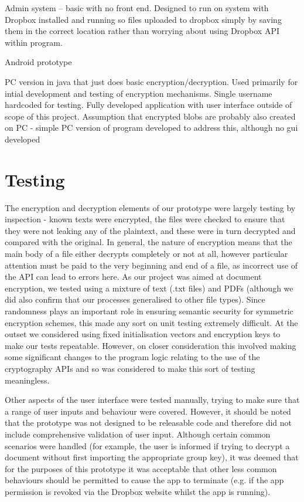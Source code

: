 Admin system – basic with no front end.  Designed to run on system with Dropbox installed and running so files uploaded to dropbox simply by saving them in the correct location rather than worrying about using Dropbox API within program.

Android prototype

PC version in java that just does basic encryption/decryption.  Used primarily for intial development and testing of encryption mechanisms. Single username hardcoded for testing. Fully developed application with user interface outside of scope of this project. Assumption that encrypted blobs are probably also created on PC - simple PC version of program developed to address this, although no gui developed
\section{Testing}

The encryption and decryption elements of our prototype were largely testing by inspection - known texts were encrypted, the files were checked to ensure that they were not leaking any of the plaintext, and these were in turn decrypted and compared with the original.   In general, the nature of encryption means that the main body of a file either decrypts completely or not at all, however particular attention must be paid to the very beginning and end of a file, as incorrect use of the API can lead to errors here.  As our project was aimed at document encryption, we tested using a mixture of text (.txt files) and PDFs (although we did also confirm that our processes generalised to other file types).  Since randomness plays an important role in ensuring  semantic security  for symmetric encryption schemes, this made any sort on unit testing extremely difficult.  At the outset we considered using fixed initialisation vectors and encryption keys to make our tests repeatable.  However, on closer consideration this involved making some significant changes to the program logic relating to the use of the cryptography APIs and so was considered to make this sort of testing meaningless.  

Other aspects of the user interface were tested manually, trying to make sure that a range of user inputs and behaviour were covered.  However, it should be noted that the prototype was not designed to be releasable code and therefore did not include comprehensive validation of user input. Although certain common scenarios were handled (for example, the user is informed if trying to decrypt a document without first importing the appropriate group key), it was deemed that for the purposes of this prototype it was acceptable that other less common behaviours should be permitted to cause the app to terminate (e.g. if the app permission is revoked via the Dropbox website whilst the app is running).  

